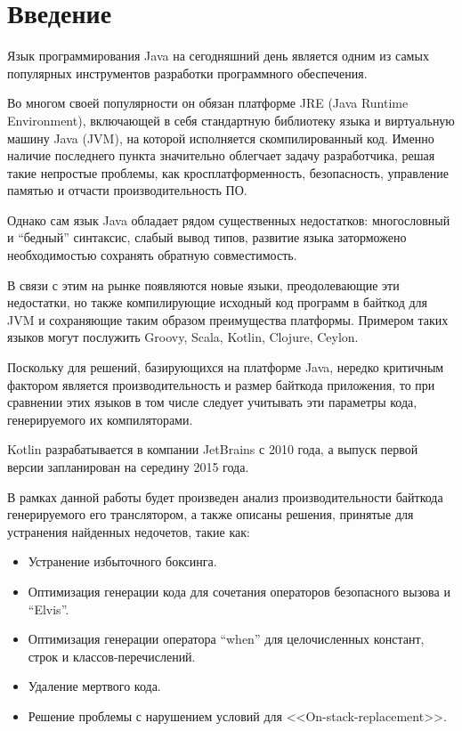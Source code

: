 \clearpage
\section*{Введение}

Язык программирования Java на сегодняшний день является одним из самых популярных инструментов
разработки программного обеспечения. %

Во многом своей популярности он обязан платформе JRE (Java Runtime Environment), включающей в себя
стандартную библиотеку языка и виртуальную машину Java (JVM), на которой исполняется скомпилированный код.
Именно наличие последнего пункта значительно облегчает задачу разработчика, решая такие непростые
проблемы,  как кросплатформенность, безопасность, управление памятью и отчасти производительность ПО.

Однако сам язык Java обладает рядом существенных недостатков: многословный и ``бедный'' синтаксис,
слабый вывод типов, развитие языка заторможено необходимостью сохранять обратную совместимость.

В связи с этим на рынке появляются новые языки, преодолевающие эти недостатки, но также
компилирующие исходный код программ в байткод для JVM и сохраняющие таким образом преимущества платформы.
Примером таких языков могут послужить Groovy, Scala, Kotlin, Clojure, Ceylon.

Поскольку для решений, базирующихся на платформе Java, нередко критичным фактором является
производительность и размер байткода приложения, то при сравнении этих языков в том числе следует
учитывать эти параметры кода, генерируемого их компиляторами.

Kotlin разрабатывается в компании JetBrains с 2010 года, а выпуск первой версии запланирован на середину 2015 года.

В рамках данной работы будет произведен анализ производительности байткода генерируемого его транслятором,
а также описаны решения, принятые для устранения найденных недочетов, такие как:
\begin{itemize}
    \item Устранение избыточного боксинга.
    \item Оптимизация генерации кода для сочетания операторов безопасного вызова и ``Elvis''.
    \item Оптимизация генерации оператора ``when'' для целочисленных констант, строк и классов-перечислений.
    \item Удаление мертвого кода.
    \item Решение проблемы с нарушением условий для <<On-stack-replacement>>.
\end{itemize}

